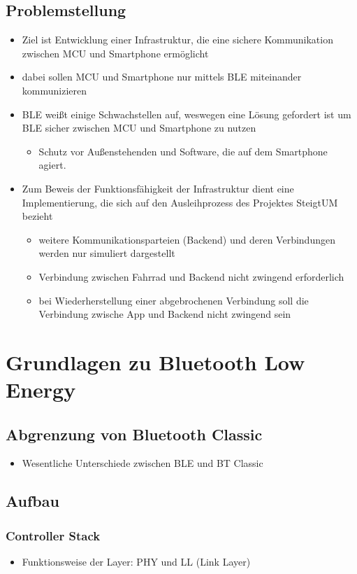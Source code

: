 \documentclass[doktyp=barbeit]{TUBAFarbeiten}
\begin{document}
\subsection{Problemstellung}
\begin{itemize}
	\item Ziel ist Entwicklung einer Infrastruktur, die eine sichere Kommunikation zwischen MCU und Smartphone ermöglicht
	\item dabei sollen MCU und Smartphone nur mittels BLE miteinander kommunizieren
	\item BLE weißt einige Schwachstellen auf, weswegen eine Lösung gefordert ist um BLE sicher zwischen MCU und Smartphone zu nutzen
	\begin{itemize}
		\item Schutz vor Außenstehenden und Software, die auf dem Smartphone agiert.
	\end{itemize}
	\item Zum Beweis der Funktionsfähigkeit der Infrastruktur dient eine Implementierung, die sich auf den Ausleihprozess des Projektes SteigtUM bezieht
	\begin{itemize}
		\item weitere Kommunikationsparteien (Backend) und deren Verbindungen werden nur simuliert dargestellt
		\item Verbindung zwischen Fahrrad und Backend nicht zwingend erforderlich
		\item bei Wiederherstellung einer abgebrochenen Verbindung soll die Verbindung zwische App und Backend nicht zwingend sein
	\end{itemize}
\end{itemize}

\section{Grundlagen zu Bluetooth Low Energy}
\subsection{Abgrenzung von Bluetooth Classic}
\begin{itemize}
	\item Wesentliche Unterschiede zwischen BLE und BT Classic
\end{itemize}
\subsection{Aufbau}
	\subsubsection{Controller Stack}
	\begin{itemize}
		\item Funktionsweise der Layer: PHY und LL (Link Layer)
	\end{itemize}
\end{document}
